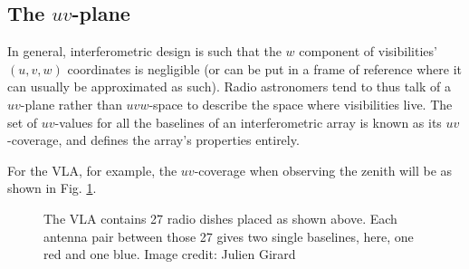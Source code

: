 \subsection{The $uv$-plane}

\pg
In general, interferometric design is such that the $w$ component of visibilities' $(u,v,w)$ coordinates is negligible (or can be put in a frame of reference where it can usually be approximated as such). Radio astronomers tend to thus talk of a $uv$-plane rather than $uvw$-space to describe the space where visibilities live. The set of $uv$-values for all the baselines of an interferometric array is known as its $uv$-coverage, and defines the array's properties entirely.

\pg
For the VLA, for example, the $uv$-coverage when observing the zenith will be as shown in Fig. \ref{fig.vla.uvcoverage}.

\begin{figure}[ht]
\centering
{}
\caption{\label{fig.vla.uvcoverage} The VLA contains 27 radio dishes placed as shown above. Each antenna pair between those 27 gives two single baselines, here, one red and one blue. Image credit: Julien Girard}
\end{figure}


